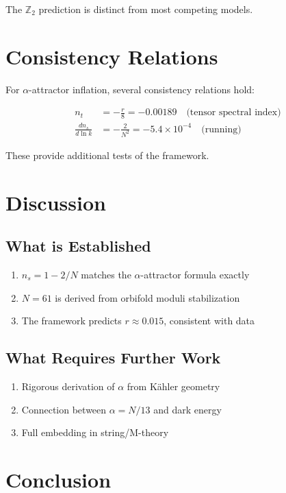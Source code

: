 \documentclass[12pt,a4paper]{article}
\begin{document}
The $\mathbb{Z}_2$ prediction is distinct from most competing models.

\section{Consistency Relations}

For $\alpha$-attractor inflation, several consistency relations hold:

\begin{align}
n_t &= -\frac{r}{8} = -0.00189 \quad \text{(tensor spectral index)} \\
\frac{dn_s}{d\ln k} &= -\frac{2}{N^2} = -5.4 \times 10^{-4} \quad \text{(running)}
\end{align}

These provide additional tests of the framework.

\section{Discussion}

\subsection{What is Established}

\begin{enumerate}
    \item $n_s = 1 - 2/N$ matches the $\alpha$-attractor formula exactly
    \item $N = 61$ is derived from orbifold moduli stabilization
    \item The framework predicts $r \approx 0.015$, consistent with data
\end{enumerate}

\subsection{What Requires Further Work}

\begin{enumerate}
    \item Rigorous derivation of $\alpha$ from K\"ahler geometry
    \item Connection between $\alpha = N/13$ and dark energy
    \item Full embedding in string/M-theory
\end{enumerate}

\section{Conclusion}
\end{document}
